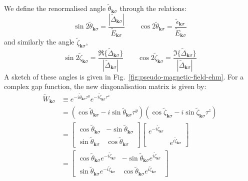 We define the renormalised angle $\tilde{\theta}_{\mathbf{k}\sigma}$ through the relations:
\begin{equation}\label{eq:af-ehm-(~theta)}
	\sin 2\tilde{\theta}_{\mathbf{k}\sigma} = \frac{|\tilde{\Delta}_{\mathbf{k}\sigma}|}{\tilde{E}_{\mathbf{k}\sigma}}
	\qquad
	\cos 2\tilde{\theta}_{\mathbf{k}\sigma} = \frac{\tilde{\epsilon}_{\mathbf{k}\sigma}}{\tilde{E}_{\mathbf{k}\sigma}}
\end{equation}
and similarly the angle $\tilde{\zeta}_{\mathbf{k}\sigma}$,
\begin{equation}\label{eq:af-ehm-(~zeta)}
	\sin 2\tilde{\zeta}_{\mathbf{k}\sigma} = \frac{\Re\{\tilde{\Delta}_{\mathbf{k}\sigma}\}}{|\tilde{\Delta}_{\mathbf{k}\sigma}|}
	\qquad
	\cos 2\tilde{\zeta}_{\mathbf{k}\sigma} = \frac{\Im\{\tilde{\Delta}_{\mathbf{k}\sigma}\}}{|\tilde{\Delta}_{\mathbf{k}\sigma}|}
\end{equation}
A sketch of these angles is given in Fig.~\ref{fig:pseudo-magnetic-field-ehm}. For a complex gap function, the new diagonalisation matrix is given by:
\begin{align}
	\tilde{W}_{\mathbf{k}\sigma} &\equiv e^{-i \tilde{\theta}_{\mathbf{k}\sigma} \tau^y} e^{-i \tilde{\zeta}_{\mathbf{k}\sigma} \tau^z} \nonumber\\
	&= \left(\cos \tilde{\theta}_{\mathbf{k}\sigma} -i \sin \tilde{\theta}_{\mathbf{k}\sigma} \tau^y \right) \left(\cos \tilde{\zeta}_{\mathbf{k}\sigma} -i \sin \tilde{\zeta}_{\mathbf{k}\sigma} \tau^z \right) \nonumber\\
	&= \begin{bmatrix}
		\cos \tilde{\theta}_{\mathbf{k}\sigma} & - \sin \tilde{\theta}_{\mathbf{k}\sigma} \\
		\sin \tilde{\theta}_{\mathbf{k}\sigma} & \cos \tilde{\theta}_{\mathbf{k}\sigma}
	\end{bmatrix} \begin{bmatrix}
		e^{-i\tilde{\zeta}_{\mathbf{k}\sigma}} & \\ 
		& e^{i\tilde{\zeta}_{\mathbf{k}\sigma}}
	\end{bmatrix} \nonumber \\
	&= \begin{bmatrix}
		\cos \tilde{\theta}_{\mathbf{k}\sigma} e^{-i\tilde{\zeta}_{\mathbf{k}\sigma}} & - \sin \tilde{\theta}_{\mathbf{k}\sigma} e^{i\tilde{\zeta}_{\mathbf{k}\sigma}} \\
		\sin \tilde{\theta}_{\mathbf{k}\sigma} e^{-i\tilde{\zeta}_{\mathbf{k}\sigma}} & \cos \tilde{\theta}_{\mathbf{k}\sigma} e^{i\tilde{\zeta}_{\mathbf{k}\sigma}}
	\end{bmatrix} \nonumber
\end{align}
